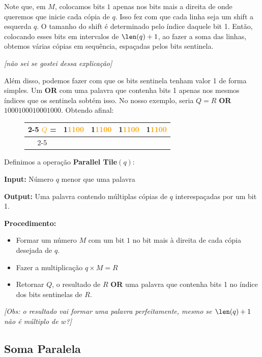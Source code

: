 Note que, em $M$, colocamos bits $1$ apenas nos bits mais a direita de onde
queremos que inicie cada cópia de $q$. Isso fez com que cada linha seja um shift
a esquerda $q$. O tamanho do shift é determinado pelo índice daquele bit 1.
Então, colocando esses bits em intervalos de $\len(q)+1$, ao fazer a soma das
linhas, obtemos várias cópias em sequência, espaçadas pelos bits sentinela.

\textit{[não sei se gostei dessa explicação]}

Além disso, podemos fazer com que os bits sentinela tenham valor 1 de forma
simples. Um \textbf{OR} com uma palavra que contenha bits 1 apenas nos mesmos
índices que os sentinela sobtém isso. No nosso exemplo, seria $Q = R$
\textbf{OR} $1000100010001000$. Obtendo afinal:


\begin{figure}[h]
\bf \Large \centering
\begin{tabular}{c|cccc|}
\cline{2-5}
\textcolor{Orange}{$Q$} = &
\textcolor{RawSienna}{1}\textcolor{Orange}{1100} &
\textcolor{RawSienna}{1}\textcolor{Orange}{1100} &
\textcolor{RawSienna}{1}\textcolor{Orange}{1100} & \textcolor{RawSienna}{1}\textcolor{Orange}{1100} \\
\cline{2-5}
\end{tabular}
\end{figure}

Definimos a operação \textbf{Parallel Tile}$(q)$:

\textbf{Input:} Número $q$ menor que uma palavra

\textbf{Output:} Uma palavra contendo múltiplas cópias de $q$ interespaçadas por
um bit 1.

\textbf{Procedimento:} 
\begin{itemize}
    \item Formar um número $M$ com um bit $1$ no bit mais à direita de cada
    cópia desejada de $q$. 
    \item Fazer a multiplicação $q \times M = R$
    \item Retornar $Q$, o resultado de $R$ \textbf{OR} uma palavra que contenha
    bits 1 no índice dos bits sentinelas de $R$. 
\end{itemize} 

\textit{[Obs: o resultado vai formar uma palavra perfeitamente, mesmo se $\len(q)+1$ não é múltiplo de $w$?]}

\subsection{Soma Paralela}

